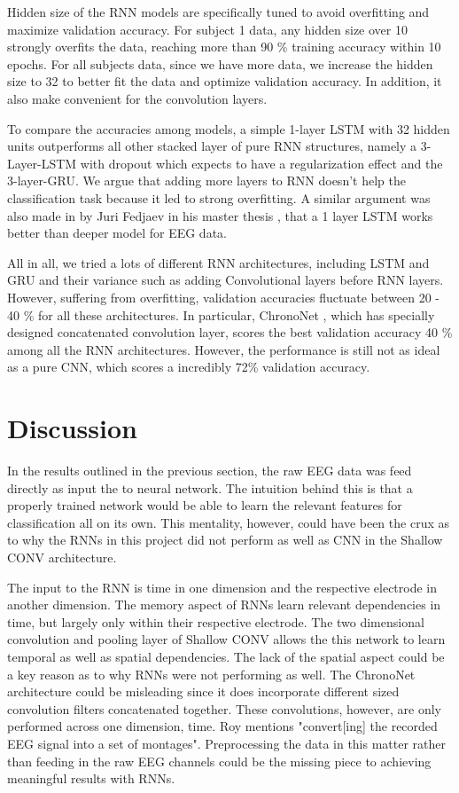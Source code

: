 \documentclass[10pt,twocolumn,letterpaper]{article}
\begin{document}
Hidden size of the RNN models are specifically tuned to avoid overfitting and maximize validation accuracy. For subject 1 data, any hidden size over 10 strongly overfits the data, reaching more than 90 \% training accuracy within 10 epochs. For all subjects data, since we have more data, we increase the hidden size to 32 to better fit the data and optimize validation accuracy. In addition, it also make convenient for the convolution layers. \par

To compare the accuracies among models, a simple 1-layer LSTM with 32 hidden units outperforms all other stacked layer of pure RNN structures, namely a 3-Layer-LSTM with dropout which expects to have a regularization effect and the 3-layer-GRU. We argue that adding more layers to RNN doesn't help the classification task because it led to strong overfitting. A similar argument was also made in by Juri Fedjaev in his master thesis \cite{LSTM}, that a 1 layer LSTM works better than deeper model for EEG data. \par

All in all, we tried a lots of different RNN architectures, including LSTM and GRU and their variance such as adding Convolutional layers before RNN layers. However, suffering from overfitting, validation accuracies fluctuate between 20 - 40 \% for all these architectures. In particular, ChronoNet \cite{ChronoNet}, which has specially designed concatenated convolution layer, scores the best validation accuracy 40 \% among all the RNN architectures. However, the performance is still not as ideal as a pure CNN, which scores a incredibly 72\% validation accuracy.
 
\section{Discussion}
In the results outlined in the previous section, the raw EEG data was feed directly as input the to neural network. The intuition behind this is that a properly trained network would be able to learn the relevant features for classification all on its own.  This mentality, however, could have been the crux as to why the RNNs in this project did not perform as well as CNN in the Shallow CONV architecture. 

The input to the RNN is time in one dimension and the respective electrode in another dimension. The memory aspect of RNNs learn relevant dependencies in time, but largely only within their respective electrode. The two dimensional convolution and pooling layer of Shallow CONV allows the this network to learn temporal as well as spatial dependencies. The lack of the spatial aspect could be a key reason as to why RNNs were not performing as well. The ChronoNet architecture could be misleading since it does incorporate different sized convolution filters concatenated together. These convolutions, however, are only performed across one dimension, time. Roy mentions "convert[ing] the recorded EEG signal into a set of montages"\cite{ChronoNet}. Preprocessing the data in this matter rather than feeding in the raw EEG channels could be the missing piece to achieving meaningful results with RNNs.
\end{document}

